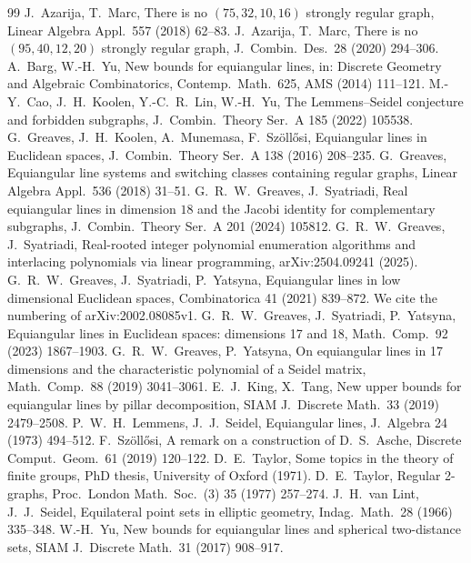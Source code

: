 \documentclass[11pt]{article}
\theoremstyle{definition}
\begin{document}
\begin{thebibliography}{99}
 J.~Azarija, T.~Marc, There is no $(75,32,10,16)$ strongly regular graph, Linear Algebra Appl.\ 557 (2018) 62--83.
 J.~Azarija, T.~Marc, There is no $(95,40,12,20)$ strongly regular graph, J.\ Combin.\ Des.\ 28 (2020) 294--306.
 A.~Barg, W.-H.~Yu, New bounds for equiangular lines, in: Discrete Geometry and Algebraic Combinatorics, Contemp.\ Math.\ 625, AMS (2014) 111--121.
 M.-Y.~Cao, J.~H.~Koolen, Y.-C.~R.~Lin, W.-H.~Yu, The Lemmens--Seidel conjecture and forbidden subgraphs, J.\ Combin.\ Theory Ser.\ A 185 (2022) 105538.
 G.~Greaves, J.~H.~Koolen, A.~Munemasa, F.~Sz\"oll\H{o}si, Equiangular lines in Euclidean spaces, J.\ Combin.\ Theory Ser.\ A 138 (2016) 208--235.
 G.~Greaves, Equiangular line systems and switching classes containing regular graphs, Linear Algebra Appl.\ 536 (2018) 31--51.
 G.~R.~W.~Greaves, J.~Syatriadi, Real equiangular lines in dimension $18$ and the Jacobi identity for complementary subgraphs, J.\ Combin.\ Theory Ser.\ A 201 (2024) 105812.
 G.~R.~W.~Greaves, J.~Syatriadi, Real-rooted integer polynomial enumeration algorithms and interlacing polynomials via linear programming, arXiv:2504.09241 (2025).
 G.~R.~W.~Greaves, J.~Syatriadi, P.~Yatsyna, Equiangular lines in low dimensional Euclidean spaces, Combinatorica 41 (2021) 839--872. We cite the numbering of arXiv:2002.08085v1.
 G.~R.~W.~Greaves, J.~Syatriadi, P.~Yatsyna, Equiangular lines in Euclidean spaces: dimensions 17 and 18, Math.\ Comp.\ 92 (2023) 1867--1903.
 G.~R.~W.~Greaves, P.~Yatsyna, On equiangular lines in 17 dimensions and the characteristic polynomial of a Seidel matrix, Math.\ Comp.\ 88 (2019) 3041--3061.
 E.~J.~King, X.~Tang, New upper bounds for equiangular lines by pillar decomposition, SIAM J.\ Discrete Math.\ 33 (2019) 2479--2508.
 P.~W.~H.~Lemmens, J.~J.~Seidel, Equiangular lines, J.\ Algebra 24 (1973) 494--512.
 F.~Sz\"oll\H{o}si, A remark on a construction of D.~S.~Asche, Discrete Comput.\ Geom.\ 61 (2019) 120--122.
 D.~E.~Taylor, Some topics in the theory of finite groups, PhD thesis, University of Oxford (1971).
 D.~E.~Taylor, Regular 2-graphs, Proc.\ London Math.\ Soc.\ (3) 35 (1977) 257--274.
 J.~H.~van Lint, J.~J.~Seidel, Equilateral point sets in elliptic geometry, Indag.\ Math.\ 28 (1966) 335--348.
 W.-H.~Yu, New bounds for equiangular lines and spherical two-distance sets, SIAM J.\ Discrete Math.\ 31 (2017) 908--917.
\end{thebibliography}
\end{document}
